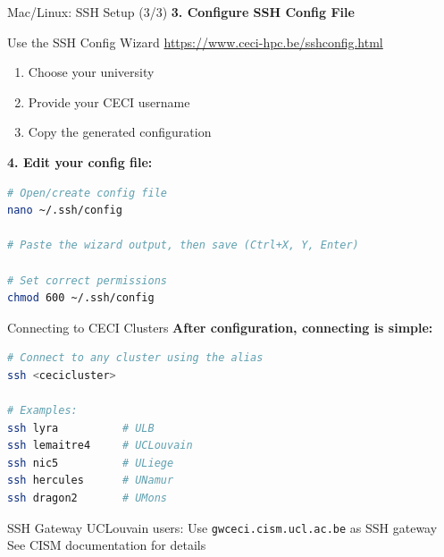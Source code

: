 \documentclass[aspectratio=169]{beamer}
\begin{document}
\begin{frame}[fragile]{Mac/Linux: SSH Setup (3/3)}
\textbf{3. Configure SSH Config File}

\begin{block}{Use the SSH Config Wizard}
\url{https://www.ceci-hpc.be/sshconfig.html}
\begin{enumerate}
    \item Choose your university
    \item Provide your CECI username
    \item Copy the generated configuration
\end{enumerate}
\end{block}

\textbf{4. Edit your config file:}
\begin{lstlisting}[language=bash]
# Open/create config file
nano ~/.ssh/config

# Paste the wizard output, then save (Ctrl+X, Y, Enter)

# Set correct permissions
chmod 600 ~/.ssh/config
\end{lstlisting}
\end{frame}

\begin{frame}[fragile]{Connecting to CECI Clusters}
\textbf{After configuration, connecting is simple:}

\begin{lstlisting}[language=bash]
# Connect to any cluster using the alias
ssh <cecicluster>

# Examples:
ssh lyra          # ULB
ssh lemaitre4     # UCLouvain
ssh nic5          # ULiege
ssh hercules      # UNamur
ssh dragon2       # UMons
\end{lstlisting}

\vspace{0.1em}
\begin{alertblock}{SSH Gateway}
UCLouvain users: Use \texttt{gwceci.cism.ucl.ac.be} as SSH gateway\\
See CISM documentation for details
\end{alertblock}
\end{frame}
\end{document}
